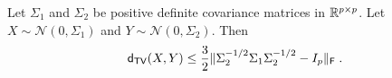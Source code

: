 \begin{lemma}
\label{Pinsker}
Let $\Sigma_1$ and $\Sigma_2$ be positive definite covariance matrices in $\mathbb{R}^{p \times p}$. Let $X \sim \mathcal{N}(0, \Sigma_1)$ and $Y \sim \mathcal{N}(0, \Sigma_2)$. Then
\begin{equation}
\mathsf{d}_{\mathsf{TV}}(X, Y) \le \frac{3}{2} \|\Sigma_2^{-1/2} \Sigma_1 \Sigma_2^{-1/2} - I_p\|_{\mathsf{F}} \;.
\end{equation}
\end{lemma}





